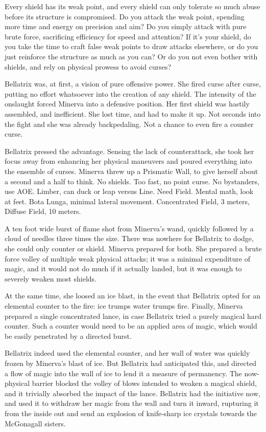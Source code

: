 Every shield has its weak point, and every shield can only tolerate so much abuse before its structure is compromised. Do you attack the weak point, spending more time and energy on precision and aim? Do you simply attack with pure brute force, sacrificing efficiency for speed and attention? If it’s your shield, do you take the time to craft false weak points to draw attacks elsewhere, or do you just reinforce the structure as much as you can? Or do you not even bother with shields, and rely on physical prowess to avoid curses?

Bellatrix was, at first, a vision of pure offensive power. She fired curse after curse, putting no effort whatsoever into the creation of any shield. The intensity of the onslaught forced Minerva into a defensive position. Her first shield was hastily assembled, and inefficient. She lost time, and had to make it up. Not seconds into the fight and she was already backpedaling. Not a chance to even fire a counter curse.

Bellatrix pressed the advantage. Sensing the lack of counterattack, she took her focus away from enhancing her physical maneuvers and poured everything into the ensemble of curses. Minerva threw up a Prismatic Wall, to give herself about a second and a half to think. No shields. Too fast, no point curse. No bystanders, use AOE. Limber, can duck or leap versus Line. Need Field. Mental math, look at feet. Bota Lunga, minimal lateral movement. Concentrated Field, 3 meters, Diffuse Field, 10 meters.

A ten foot wide burst of flame shot from Minerva’s wand, quickly followed by a cloud of needles three times the size. There was nowhere for Bellatrix to dodge, she could only counter or shield. Minerva prepared for both. She prepared a brute force volley of multiple weak physical attacks; it was a minimal expenditure of magic, and it would not do much if it actually landed, but it was enough to severely weaken most shields.

At the same time, she loosed an ice blast, in the event that Bellatrix opted for an elemental counter to the fire: ice trumps water trumps fire. Finally, Minerva prepared a single concentrated lance, in case Bellatrix tried a purely magical hard counter. Such a counter would need to be an applied area of magic, which would be easily penetrated by a directed burst.

Bellatrix indeed used the elemental counter, and her wall of water was quickly frozen by Minerva’s blast of ice. But Bellatrix had anticipated this, and directed a flow of magic into the wall of ice to lend it a measure of permanency. The now-physical barrier blocked the volley of blows intended to weaken a magical shield, and it trivially absorbed the impact of the lance. Bellatrix had the initiative now, and used it to withdraw her magic from the wall and turn it inward, rupturing it from the inside out and send an explosion of knife-sharp ice crystals towards the McGonagall sisters.

